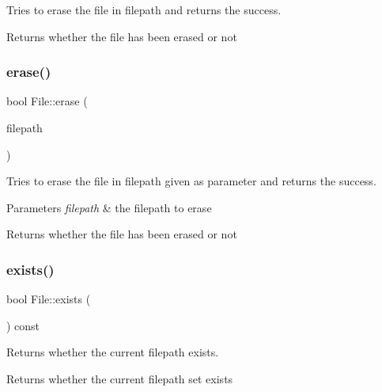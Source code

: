 Tries to erase the file in filepath and returns the success. 

\begin{DoxyReturn}{Returns}
whether the file has been erased or not 
\end{DoxyReturn}
\mbox{\label{class_file_a068634b55657c13f0f79691434c399b1}} 
\subsubsection{\texorpdfstring{erase()}{erase()}\hspace{0.1cm}{\footnotesize\ttfamily [2/2]}}
{\footnotesize\ttfamily bool File\+::erase (\begin{DoxyParamCaption}\item[{const \mbox{\hyperlink{class_a_string}{A\+String}} \&}]{filepath }\end{DoxyParamCaption})\hspace{0.3cm}{\ttfamily [static]}}



Tries to erase the file in filepath given as parameter and returns the success. 


\begin{DoxyParams}{Parameters}
{\em filepath} & the filepath to erase \\
\hline
\end{DoxyParams}
\begin{DoxyReturn}{Returns}
whether the file has been erased or not 
\end{DoxyReturn}
\mbox{\label{class_file_a53118ce36851cb1c6845a82f915fd8ba}} 
\subsubsection{\texorpdfstring{exists()}{exists()}\hspace{0.1cm}{\footnotesize\ttfamily [1/2]}}
{\footnotesize\ttfamily bool File\+::exists (\begin{DoxyParamCaption}{ }\end{DoxyParamCaption}) const}



Returns whether the current filepath exists. 

\begin{DoxyReturn}{Returns}
whether the current filepath set exists 
\end{DoxyReturn}
\mbox{\label{class_file_a7b28f74e97c46f0b95ec159c2425dca0}} 
